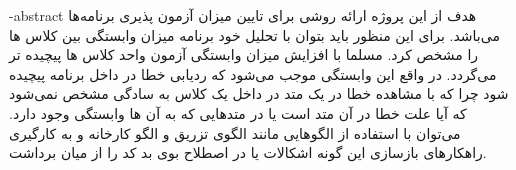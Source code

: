 \fa-abstract{
هدف از این پروژه ارائه روشی برای تایین میزان آزمون پذیری برنامه‌ها می‌باشد. برای این منظور  باید بتوان با تحلیل خود برنامه میزان وابستگی بین کلاس ها را مشخص کرد. مسلما با افزایش میزان وابستگی آزمون واحد  کلاس ها پیچیده تر می‌گردد. در واقع این وابستگی موجب می‌شود که ردیابی خطا در داخل برنامه پیچیده شود چرا که با مشاهده خطا در یک متد در داخل یک کلاس به سادگی مشخص نمی‌شود که آیا علت خطا در آن متد است یا در متدهایی که به آن ها وابستگی وجود دارد. می‌توان با استفاده از الگوهایی مانند الگوی تزریق و الگو کارخانه  و به کار‌گیری راهکارهای بازسازی این گونه اشکالات یا در اصطلاح بوی بد کد  را از میان برداشت.
}


\abstractPage

\newpage\clearpage